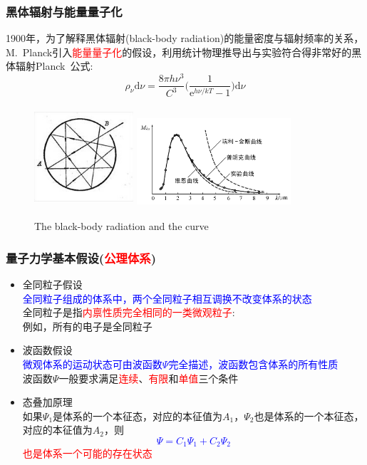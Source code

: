 \documentclass[cjk,slidestop,compress,mathserif,blue]{beamer}
\begin{document}
\frame
{
	\frametitle{黑体辐射与能量量子化}
	\textrm{1900}年，为了解释黑体辐射\textrm{(black-body radiation)}的能量密度与辐射频率的关系，\textrm{M.~Planck}引入\textcolor{red}{能量量子化}的假设，利用统计物理推导出与实验符合得非常好的黑体辐射\textrm{Planck~}公式:~
	\begin{displaymath}
		\rho_{\nu}\mathrm{d}{\nu}=\dfrac{8{\pi}h{\nu}^3}{C^3}\bigg(\dfrac1{\mathrm{e}^{h\nu/kT}-1}\bigg)\mathrm{d}\nu
	\end{displaymath}
\begin{figure}[h!]
\centering
\vspace{-10.5pt}
\includegraphics[height=1.45in,width=1.45in,viewport=0 0 136 136,clip]{Figures/Black_box.jpg}
\hskip 1pt
\includegraphics[height=1.32in,width=2.25in,viewport=0 0 390 215,clip]{Figures/Black_box_curve.png}
\caption{\textrm{The black-body radiation and the curve}}
\label{Black_box}
\end{figure}
}

\frame
{
	\frametitle{量子力学基本假设(\textcolor{red}{公理体系})}
	\begin{itemize}
		\item 全同粒子假设\\
			\textcolor{blue}{全同粒子组成的体系中，两个全同粒子相互调换不改变体系的状态}\\ 
			全同粒子是指\textcolor{red}{内禀性质完全相同的一类微观粒子}:\\例如，所有的电子是全同粒子 
		\item 波函数假设\\
			\textcolor{blue}{微观体系的运动状态可由波函数$\Psi$完全描述，波函数包含体系的所有性质}\\
			波函数$\Psi$一般要求满足\textcolor{red}{连续}、\textcolor{red}{有限}和\textcolor{red}{单值}三个条件
		\item 态叠加原理\\
			如果$\Psi_1$是体系的一个本征态，对应的本征值为$A_1$，$\Psi_2$也是体系的一个本征态，对应的本征值为$A_2$，则\textcolor{blue}{$$\Psi=C_1\Psi_1+C_2\Psi_2$$}\textcolor{red}{也是体系一个可能的存在状态}
	\end{itemize}
}
\end{document}
